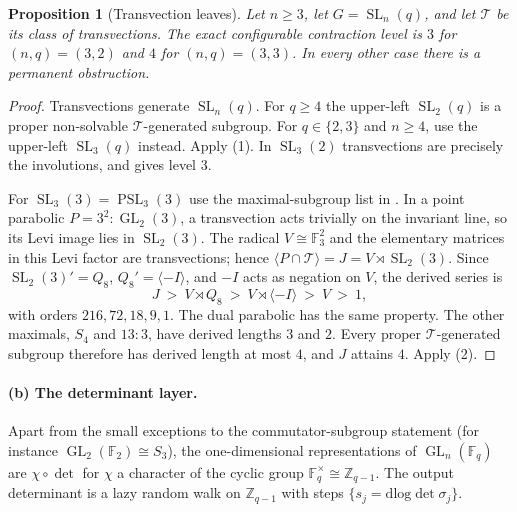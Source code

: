 \documentclass[11pt]{amsart}
\newtheorem{proposition}[proposition]{Proposition}
\theoremstyle{definition}
\theoremstyle{remark}
\theoremstyle{plain}
\theoremstyle{plain}
\numberwithin{equation}{section}
\DeclareMathOperator{\GL}{GL}
\DeclareMathOperator{\SL}{SL}
\DeclareMathOperator{\PSL}{PSL}
\newcommand{\F}{\mathbb{F}}
\newcommand{\Z}{\mathbb{Z}}
\begin{document}
\begin{proposition}[Transvection leaves]
\label{prop:transvection-levels}
Let $n\ge3$, let $G=\SL_n(q)$, and let $\mathcal T$ be its class of
transvections. The exact configurable contraction level is $3$ for
$(n,q)=(3,2)$ and $4$ for $(n,q)=(3,3)$. In every other case there is
a permanent obstruction.
\end{proposition}
\begin{proof}
Transvections generate $\SL_n(q)$. For $q\ge4$ the upper-left
$\SL_2(q)$ is a proper non-solvable $\mathcal T$-generated subgroup.
For $q\in\{2,3\}$ and $n\ge4$, use the upper-left $\SL_3(q)$ instead.
Apply (1). In $\SL_3(2)$ transvections are precisely
the involutions, and  gives level $3$.

For $\SL_3(3)=\PSL_3(3)$ use the maximal-subgroup list in
. In a point parabolic $P=3^2{:}\GL_2(3)$,
a transvection acts trivially on the invariant line, so its Levi image
lies in $\SL_2(3)$. The radical $V\cong\F_3^2$ and the elementary
matrices in this Levi factor are transvections; hence
$\langle P\cap\mathcal T\rangle=J=V\rtimes\SL_2(3)$.
Since $\SL_2(3)'=Q_8$, $Q_8'=\langle-I\rangle$, and $-I$ acts as
negation on $V$, the derived series is
\[
 J\ >\ V\rtimes Q_8\ >\ V\rtimes\langle-I\rangle\ >\ V\ >\ 1,
\]
with orders $216,72,18,9,1$. The dual parabolic has the same property.
The other maximals, $S_4$ and $13{:}3$, have derived lengths $3$ and $2$.
Every proper $\mathcal T$-generated subgroup therefore has derived
length at most $4$, and $J$ attains $4$. Apply (2).
\end{proof}

\paragraph{(b) The determinant layer.}
Apart from the small exceptions to the commutator-subgroup statement (for instance
$\GL_2(\F_2)\cong S_3$), the one-dimensional representations of $\GL_n(\F_q)$ are
$\chi\circ\det$ for $\chi$ a character of the cyclic group
$\F_q^\times\cong\Z_{q-1}$. The output determinant is a lazy random walk on $\Z_{q-1}$ with
steps $\{s_j=\mathrm{dlog}\det\sigma_j\}$.
\end{document}
